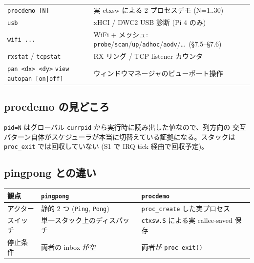 \documentclass[a4paper,11pt]{ltjsarticle}
\begin{document}
\begin{center}
\begin{longtable}{@{}l p{8.6cm}@{}}
\verb|procdemo [N]|      & 実 ctxsw による 2 プロセスデモ (N=1..30)\\
\verb|usb|              & xHCI / DWC2 USB 診断 (Pi 4 のみ)\\
\verb|wifi ...|          & WiFi + メッシュ: \verb|probe|/\verb|scan|/\verb|up|/\verb|adhoc|/\verb|aodv|/\dots\ (§7.5--§7.6)\\
\verb|rxstat| / \verb|tcpstat| & RX リング / TCP listener カウンタ\\
\verb|pan <dx> <dy>| \verb|view| \verb!autopan [on|off]! & ウィンドウマネージャのビューポート操作\\
\bottomrule
\end{longtable}
\end{center}

\subsection{procdemo の見どころ}
\verb|pid=N| はグローバル \verb|currpid| から実行時に読み出した値なので、列方向の
交互パターン自体がスケジューラが本当に切替えている証拠になる。スタックは
\verb|proc_exit| では回収していない (S1 で IRQ tick 経由で回収予定)。

\subsection{pingpong との違い}
\begin{center}\footnotesize
\begin{tabular}{@{}l p{4.2cm} p{5.2cm}@{}}
\toprule
\textbf{観点} & \verb|pingpong| & \verb|procdemo|\\
\midrule
アクター   & 静的 2 つ (\verb|Ping|, \verb|Pong|) & \verb|proc_create| した実プロセス\\
スイッチ   & 単一スタック上のディスパッチ & \verb|ctxsw.S| による実 callee-saved 保存\\
停止条件   & 両者の inbox が空 & 両者が \verb|proc_exit()|\\
\bottomrule
\end{tabular}
\end{center}
\end{document}
